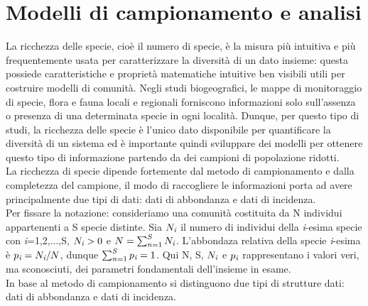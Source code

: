 \chapter{Modelli di campionamento e analisi}









La ricchezza delle specie, cioè il numero di specie, è la misura più intuitiva e più frequentemente usata per caratterizzare la diversità di un dato insieme: questa possiede caratteristiche e proprietà matematiche intuitive ben visibili utili per costruire modelli di comunità. Negli studi biogeografici, le mappe di monitoraggio di specie, flora e fauna locali e regionali forniscono informazioni solo sull'assenza o presenza di una determinata specie in ogni località. Dunque, per questo tipo di studi, la ricchezza delle specie è l'unico dato disponibile per quantificare la diversità di un sistema ed è importante quindi sviluppare dei modelli per ottenere questo tipo di informazione partendo da dei campioni di popolazione ridotti.\\
La ricchezza di specie dipende fortemente dal metodo di campionamento e dalla completezza del campione, il modo di raccogliere le informazioni porta ad avere principalmente due tipi di dati: dati di abbondanza e dati di incidenza.\\
Per fissare la notazione: consideriamo una comunità costituita da N individui appartenenti a S specie distinte. Sia $N_\emph{i}$ il numero di individui della \emph{i}-esima specie con \emph{i}=1,2,...,S, $N_\emph{i}>0$ e $N=\sum_{n=1}^S N_\emph{i}$.
L'abbondaza relativa della specie \emph{i}-esima è $p_\emph{i}=N_\emph{i}/N$, dunque $\sum_{n=1}^S p_\emph{i}=1$. Qui N, S, $N_\emph{i}$ e $p_\emph{i}$ rappresentano i valori veri, ma sconosciuti, dei parametri fondamentali dell'insieme in esame.\\
In base al metodo di campionamento si distinguono due tipi di strutture dati: dati di abbondanza e dati di incidenza\cite{doi:ChaoChiu2016}.

